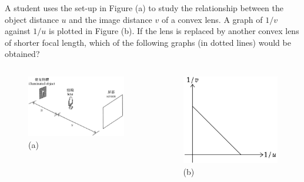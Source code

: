 \documentclass[beamer=true]{standalone}
\begin{document}
\begin{eg}
    A student uses the set-up in Figure (a) to study the relationship between the object distance $u$ and the image distance $v$ of a convex lens. A graph of $1/v$ against $1/u$ is plotted in Figure (b). If the lens is replaced by another convex lens of shorter focal length, which of the following graphs (in dotted lines) would be obtained?
    \begin{columns}
        \begin{figure}
            \centering
            \includegraphics[width=\linewidth]{assets/d980un82dun8923d23.png}
            \caption{(a)}
        \end{figure}
        \begin{figure}
            \centering
            \includegraphics[width=\linewidth]{assets/dm90j2d3.png}
            \caption{(b)}
        \end{figure}
    \end{columns}
\end{eg}
\end{document}
